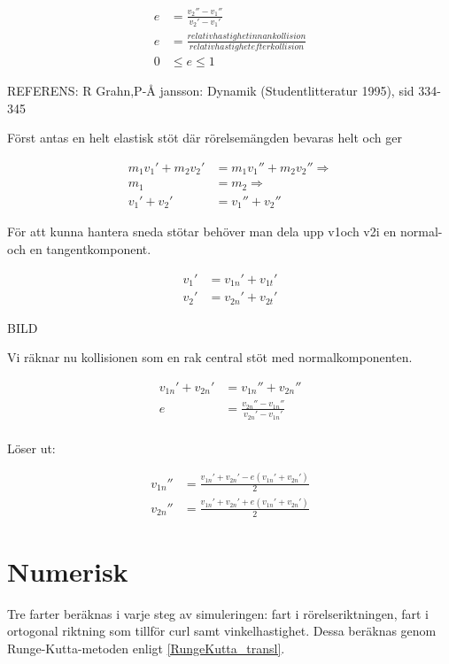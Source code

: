 \documentclass[11pt]{article} %
\begin{document}
 \begin{align}\label{e1}
 e& = \frac{v_2''-v_1''}{v_2'-v_1'}\\
 e& = \frac{relativ hastighet innan kollision}{relativ hastighet efter kollision}\\
0& \le e \le 1
 \end{align}

REFERENS: R Grahn,P-Å jansson: Dynamik (Studentlitteratur 1995), sid 334-345

Först antas en helt elastisk stöt där rörelsemängden bevaras helt och ger

 \begin{align}\label{elastisk}
m_1 v_1' + m_2 v_2'& = m_1 v_1'' + m_2 v_2'' \Rightarrow\\
m_1& = m_2 \Rightarrow\\
v_1' + v_2'& = v_1'' + v_2''
 \end{align}

För att kunna hantera sneda stötar behöver man dela upp v1och v2i en normal- och en tangentkomponent. 

 \begin{align}\label{vCollision}
v_1'& = v_{1n}' + v_{1t}'\\
v_2'& = v_{2n}' + v_{2t}'
 \end{align}

BILD

Vi räknar nu kollisionen som en rak central stöt med normalkomponenten. 

 \begin{align}\label{vCollision}
 v_{1n}' + v_{2n}'& = v_{1n}'' + v_{2n}''\\
 e& = \frac{v_{2n}''-v_{1n}''}{v_{2n}'-v_{1n}'}\\
 \end{align}

Löser ut: 

 \begin{align}\label{vCollision}
 v_{1n}''& = \frac{v_{1n}' + v_{2n}'  - e(v_{1n}' + v_{2n}')}{2} \\
 v_{2n}''& = \frac{v_{1n}' + v_{2n}'  + e(v_{1n}' + v_{2n}')}{2} 
 \end{align}

\pagebreak

\section{Numerisk}
Tre farter beräknas i varje steg av simuleringen: fart i rörelseriktningen, fart i ortogonal riktning som tillför curl samt vinkelhastighet. Dessa beräknas genom Runge-Kutta-metoden enligt \eqref{RungeKutta_transl}. 
\end{document}
